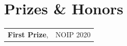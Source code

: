 
\section{Prizes \& Honors}
\begin{tabularx}{\linewidth}{@{}l X@{}}
\textbf{First Prize}, & NOIP 2020 \\
\end{tabularx}
